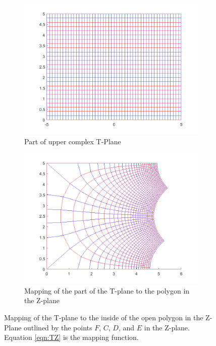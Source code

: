     \begin{figure}[h]
    \centering
    \begin{subfigure}[t]{0.45\textwidth}
        \centering
        \includegraphics[width=\textwidth]{images/TtoZ_strip.png}
        \caption{Part of upper complex T-Plane}
    \end{subfigure}
    \hfill
    \begin{subfigure}[t]{0.45\textwidth}
        \centering
        \includegraphics[width=\textwidth]{images/TtoZ_map.png}
        \caption{Mapping of the part of the T-plane to the polygon in the Z-plane}
    \end{subfigure} 
    \caption[Mapping of the T-plane to the inside of the open polygon in the Z-Plane]{Mapping of the T-plane to the inside of the open polygon in the Z-Plane outlined by the points $F$, $C$, $D$, and $E$ in the Z-plane. Equation \ref{eqn:TZ} is the mapping function.} 
    \label{fig:T_to_Z_mapping}
 \end{figure}

